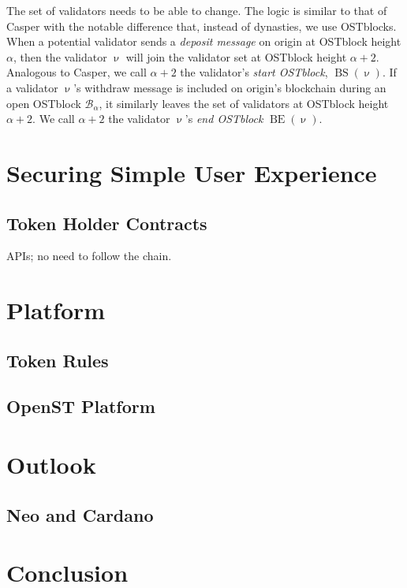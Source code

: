 \documentclass[12pt,a4paper]{article}
\newcommand{\B}{\mathcal{B}}
\newcommand{\BS}{\operatorname{BS}}
\newcommand{\BE}{\operatorname{BE}}
\begin{document}
The set of validators needs to be able to change.
The logic is similar to that of Casper with the notable difference that, instead of dynasties, we use OSTblocks.
When a potential validator sends a \emph{deposit message} on origin at OSTblock height $\alpha$,
then the validator $\upnu$ will join the validator set at OSTblock height $\alpha+2$.
Analogous to Casper, we call $\alpha+2$ the validator's \emph{start OSTblock}, $\BS(\upnu)$.
If a validator $\upnu$'s withdraw message is included on origin's blockchain during an open OSTblock $\B_\alpha$,
it similarly leaves the set of validators at OSTblock height $\alpha+2$.
We call $\alpha+2$ the validator $\upnu$'s \emph{end OSTblock} $\BE(\upnu)$.



%
%
\section{Securing Simple User Experience}

\subsection{Token Holder Contracts}

APIs; no need to follow the chain.

%
%
\section{Platform}

\subsection{Token Rules}

\subsection{OpenST Platform}

%
%
\section{Outlook}

\subsection{Neo and Cardano}

%
%
\section{Conclusion}



\end{document}
